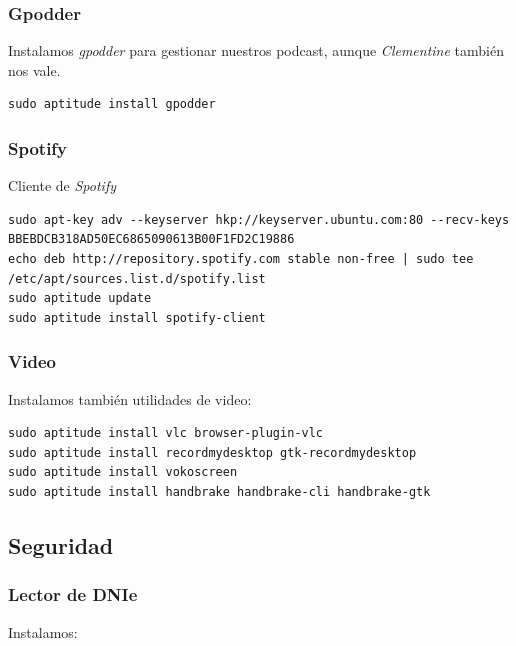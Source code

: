 \documentclass[12pt,spanish,]{scrartcl}
\begin{document}
\hypertarget{gpodder}{%
\subsubsection{Gpodder}\label{gpodder}}

Instalamos \emph{gpodder} para gestionar nuestros podcast, aunque
\emph{Clementine} también nos vale.

\begin{verbatim}
sudo aptitude install gpodder
\end{verbatim}

\hypertarget{spotify}{%
\subsubsection{Spotify}\label{spotify}}

Cliente de \emph{Spotify}

\begin{verbatim}
sudo apt-key adv --keyserver hkp://keyserver.ubuntu.com:80 --recv-keys BBEBDCB318AD50EC6865090613B00F1FD2C19886
echo deb http://repository.spotify.com stable non-free | sudo tee /etc/apt/sources.list.d/spotify.list
sudo aptitude update
sudo aptitude install spotify-client
\end{verbatim}

\hypertarget{video}{%
\subsubsection{Video}\label{video}}

Instalamos también utilidades de video:

\begin{verbatim}
sudo aptitude install vlc browser-plugin-vlc
sudo aptitude install recordmydesktop gtk-recordmydesktop
sudo aptitude install vokoscreen
sudo aptitude install handbrake handbrake-cli handbrake-gtk
\end{verbatim}

\hypertarget{seguridad}{%
\subsection{Seguridad}\label{seguridad}}

\hypertarget{lector-de-dnie}{%
\subsubsection{Lector de DNIe}\label{lector-de-dnie}}

Instalamos:
\end{document}
